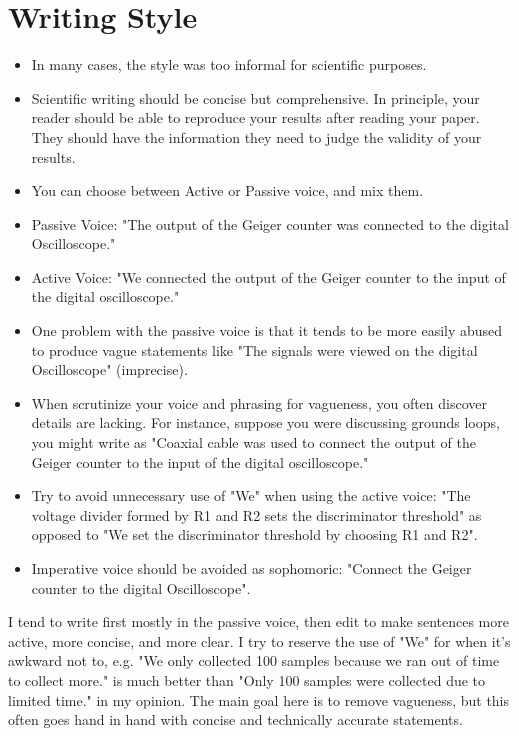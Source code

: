 \documentclass[12pt]{article}
\begin{document}
\section{Writing Style}
\begin{itemize}
\item In many cases, the style was too informal for scientific purposes.
\item Scientific writing should be concise but comprehensive.  In principle, your reader should be able to reproduce your results after reading your paper.  They should have the information they need to judge the validity of your results.
\item You can choose between Active or Passive voice, and mix them.
\item Passive Voice:  "The output of the Geiger counter was connected to the digital Oscilloscope."
\item Active Voice:  "We connected the output of the Geiger counter to the input of the digital oscilloscope."
\item One problem with the passive voice is that it tends to be more easily abused to produce vague statements like "The signals were viewed on the digital Oscilloscope" (imprecise).
\item When scrutinize your voice and phrasing for vagueness, you often discover details are lacking.  For instance, suppose you were discussing grounds loops, you might write as "Coaxial cable was used to connect the output of the Geiger counter to the input of the digital oscilloscope."
\item Try to avoid unnecessary use of "We" when using the active voice:  "The voltage divider formed by R1 and R2 sets the discriminator threshold" as opposed to "We set the discriminator threshold by choosing R1 and R2". 
\item Imperative voice should be avoided as sophomoric: "Connect the Geiger counter to the digital Oscilloscope".
\end{itemize}
I tend to write first mostly in the passive voice, then edit to make sentences more active, more concise, and more clear.  I try to reserve the use of "We" for when it's awkward not to, e.g. "We only collected 100 samples because we ran out of time to collect more."  is much better than "Only 100 samples were collected due to limited time." in my opinion.  The main goal here is to remove vagueness, but this often goes hand in hand with concise and technically accurate statements.
\end{document}
